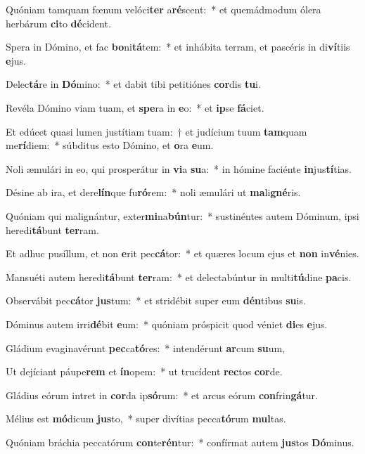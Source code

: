\item Quóniam tamquam fœnum velóci\textbf{ter} a\textbf{ré}scent:~* et quemádmodum ólera herbárum \textbf{ci}to \textbf{dé}cident.
\item Spera in Dómino, et fac \textbf{bo}ni\textbf{tá}tem:~* et inhábita terram, et pascéris in di\textbf{ví}tiis \textbf{e}jus.
\item Delec\textbf{tá}re in \textbf{Dó}mino:~* et dabit tibi petitiónes \textbf{cor}dis \textbf{tu}i.
\item Revéla Dómino viam tuam, et \textbf{spe}ra in \textbf{e}o:~* et \textbf{ip}se \textbf{fá}ciet.
\item Et edúcet quasi lumen justítiam tuam:~† et judícium tuum \textbf{tam}quam me\textbf{rí}diem:~* súbditus esto Dómino, et \textbf{o}ra \textbf{e}um.
\item Noli æmulári in eo, qui prosperátur in \textbf{vi}a \textbf{su}a:~* in hómine faciénte \textbf{in}jus\textbf{tí}tias.
\item Désine ab ira, et dere\textbf{lín}que fu\textbf{ró}rem:~* noli æmulári ut \textbf{ma}li\textbf{gné}ris.
\item Quóniam qui malignántur, exter\textbf{mi}na\textbf{bún}tur:~* sustinéntes autem Dóminum, ipsi heredi\textbf{tá}bunt \textbf{ter}ram.
\item Et adhuc pusíllum, et non \textbf{e}rit pec\textbf{cá}tor:~* et quæres locum ejus et \textbf{non} in\textbf{vé}nies.
\item Mansuéti autem heredi\textbf{tá}bunt \textbf{ter}ram:~* et delectabúntur in multi\textbf{tú}dine \textbf{pa}cis.
\item Observábit pec\textbf{cá}tor \textbf{jus}tum:~* et stridébit super eum \textbf{dén}tibus \textbf{su}is.
\item Dóminus autem irri\textbf{dé}bit \textbf{e}um:~* quóniam próspicit quod véniet \textbf{di}es \textbf{e}jus.
\item Gládium evaginavérunt \textbf{pec}ca\textbf{tó}res:~* intendérunt \textbf{ar}cum \textbf{su}um,
\item Ut dejíciant páupe\textbf{rem} et \textbf{ín}opem:~* ut trucídent \textbf{rec}tos \textbf{cor}de.
\item Gládius eórum intret in \textbf{cor}da ip\textbf{só}rum:~* et arcus eórum \textbf{con}frin\textbf{gá}tur.
\item Mélius est \textbf{mó}dicum \textbf{jus}to,~* super divítias pecca\textbf{tó}rum \textbf{mul}tas.
\item Quóniam bráchia peccatórum \textbf{con}te\textbf{rén}tur:~* confírmat autem \textbf{jus}tos \textbf{Dó}minus.
